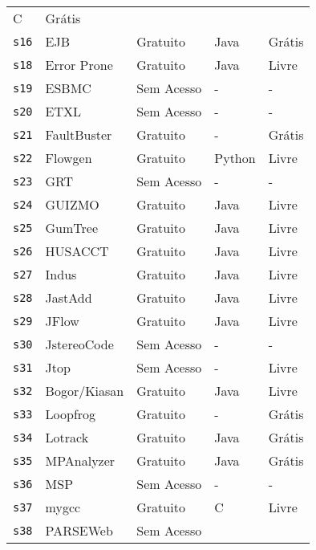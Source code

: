 \begin{longtable}{l l l p{3cm} l}
      C &
      Grátis \\
    \texttt{s16} &
      EJB &
      Gratuito &
      Java &
      Grátis \\
    \texttt{s18} &
      Error Prone &
      Gratuito &
      Java &
      Livre \\
    \texttt{s19} &
      ESBMC &
      Sem Acesso &
      - &
      - \\
    \texttt{s20} &
      ETXL &
      Sem Acesso &
      - &
      - \\
    \texttt{s21} &
      FaultBuster &
      Gratuito &
      - &
      Grátis \\
    \texttt{s22} &
      Flowgen &
      Gratuito &
      Python &
      Livre \\
    \texttt{s23} &
      GRT &
      Sem Acesso &
      - &
      - \\
    \texttt{s24} &
      GUIZMO &
      Gratuito &
      Java &
      Livre \\
    \texttt{s25} &
      GumTree &
      Gratuito &
      Java &
      Livre \\
    \texttt{s26} &
      HUSACCT &
      Gratuito &
      Java &
      Livre \\
    \texttt{s27} &
      Indus &
      Gratuito &
      Java &
      Livre \\
    \texttt{s28} &
      JastAdd &
      Gratuito &
      Java &
      Livre \\
    \texttt{s29} &
      JFlow &
      Gratuito &
      Java &
      Livre \\
    \texttt{s30} &
      JstereoCode &
      Sem Acesso &
      - &
      - \\
    \texttt{s31} &
      Jtop &
      Sem Acesso &
      - &
      Livre \\
    \texttt{s32} &
      Bogor/Kiasan &
      Gratuito &
      Java &
      Livre \\
    \texttt{s33} &
      Loopfrog &
      Gratuito &
      - &
      Grátis \\
    \texttt{s34} &
      Lotrack &
      Gratuito &
      Java &
      Grátis \\
    \texttt{s35} &
      MPAnalyzer &
      Gratuito &
      Java &
      Grátis \\
    \texttt{s36} &
      MSP &
      Sem Acesso &
      - &
      - \\
    \texttt{s37} &
      mygcc &
      Gratuito &
      C &
      Livre \\
    \texttt{s38} &
      PARSEWeb &
      Sem Acesso &

\end{longtable}
